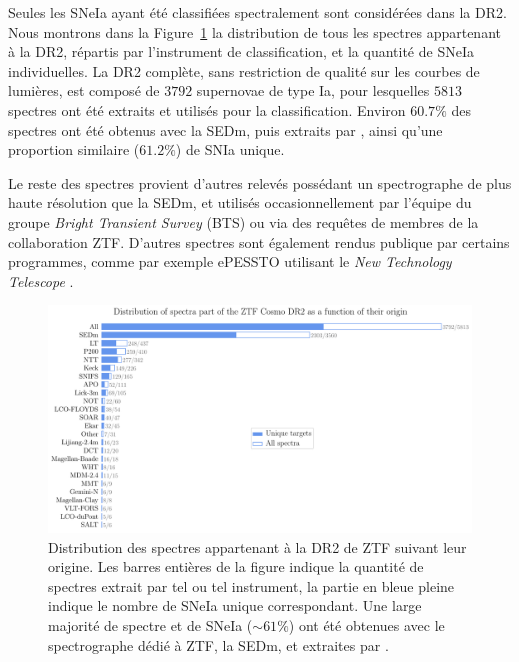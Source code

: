 \documentclass[../main/main.tex]{subfiles}
\begin{document}
Seules les SNeIa ayant été classifiées spectralement sont considérées
dans la DR2. Nous montrons dans la Figure~\ref{fig:specorigindr2} la
distribution de tous les spectres appartenant à la DR2, répartis par
l'instrument de classification, et la quantité de SNeIa individuelles.
La DR2 complète, sans restriction de qualité sur les courbes de
lumières, est composé de $3792$ supernovae de type Ia, pour lesquelles
$5813$ spectres ont été extraits et utilisés pour la classification.
Environ $60.7\%$ des spectres ont été obtenus avec la SEDm, puis
extraits par \hypergal, ainsi qu'une proportion similaire ($61.2\%$) de SNIa
unique. 

Le reste des spectres provient d'autres relevés possédant un
spectrographe de plus haute résolution que la SEDm, et utilisés
occasionnellement par
l'équipe du groupe \textit{Bright Transient Survey} (BTS) ou via des
requêtes de membres de la collaboration ZTF. D'autres spectres sont
également rendus publique par certains programmes, comme par exemple
ePESSTO utilisant le \textit{New Technology Telescope} \citep[NTT,][]{Smartt2015}.

\begin{figure}[ht]
  \centering
  \includegraphics[width=1\textwidth]{../figures/09_dr2/spec_instorigin_dr2.pdf}
  \caption[Distribution des spectres appartenant à la DR2 de ZTF suivant
  leur origine.]{Distribution des spectres appartenant à la DR2 de ZTF suivant
  leur origine. Les barres entières de la figure indique la quantité de
  spectres extrait par tel ou tel instrument, la partie en bleue pleine
  indique le nombre de SNeIa unique correspondant. Une large majorité
  de spectre et de SNeIa ($\sim61\%$) ont été obtenues avec le spectrographe dédié à
  ZTF, la SEDm, et extraites par \hypergal. }
  \label{fig:specorigindr2}
\end{figure}
\end{document}
